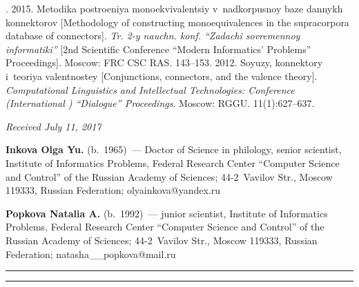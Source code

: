 \begin{multicols}{2}
{{\begin{thebibliography}{99}
. 2015. Metodika postroeniya monoekvivalentsiy 
v~nadkorpusnoy baze dannykh konnektorov [Methodology of constructing 
monoequivalences in the supracorpora database of connectors]. \textit{Tr. 2-y 
nauchn. konf. ``Zadachi sovremennoy informatiki''}
[2nd Scientific Conference ``Modern Informatics' Problems'' Proceedings]. 
Moscow: FRC CSC RAS. 143--153.
 2012. Soyuzy, konnektory i~teoriya valentnostey 
[Conjunctions, connectors, and the valence theory]. \textit{Computational Linguistics and Intellectual Technologies: 
Conference (International ) ``Dialogue'' Proceedings}. Moscow: RGGU. 11(1):627--637.
    \end{thebibliography} } }

\end{multicols}

\vspace*{-10pt}

\hfill{\small\textit{Received July 11, 2017}}



\vspace*{-16pt}

\Contr

\noindent
\textbf{Inkova Olga Yu.} (b.\ 1965)~---
 Doctor of Science in philology, senior scientist, Institute of Informatics Problems, 
 Federal Research Center ``Computer Science and Control'' 
 of the Russian Academy of Sciences; 
 44-2~Vavilov Str., Moscow 119333, Russian Federation; \mbox{olyainkova@yandex.ru}

 
\vspace*{3pt}


\noindent
\textbf{Popkova Natalia A.} (b.\ 1992)~--- 
junior scientist, Institute of Informatics Problems, Federal Research Center 
``Computer Science and Control'' of the Russian Academy of Sciences; 44-2~Vavilov 
Str., Moscow 119333, Russian Federation; \mbox{natasha\_\_popkova@mail.ru}

\vspace*{6pt}

\hrule

\vspace*{2pt}

\hrule



\vspace*{8pt}

